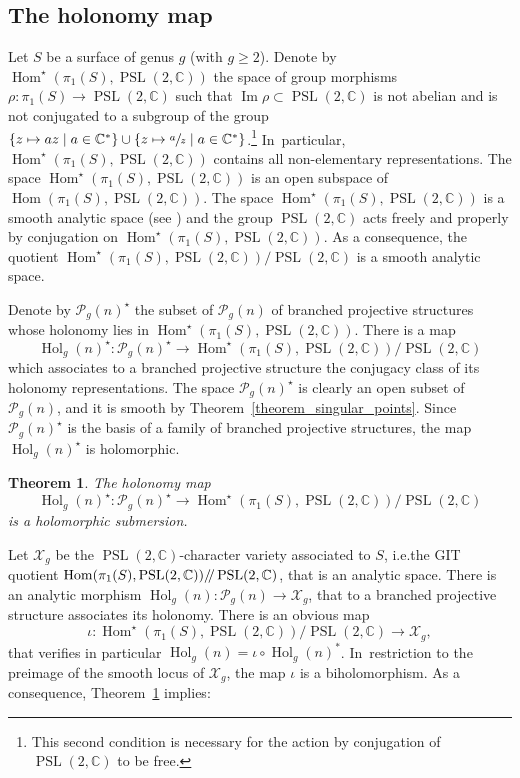\documentclass[10pt]{amsart}
\newcommand{\ie}{i.e.}
\newcommand\mto{\mathchoice{\longmapsto}{\mapsto}{\mapsto}{\mapsto}}
\newcommand{\C}{\mathbb C}
\DeclareMathOperator{\Hol}{Hol}
\DeclareMathOperator{\Hom}{Hom}
\DeclareMathOperator{\Image}{Im}
\DeclareMathOperator{\PSL}{PSL}
\theoremstyle{definition}
\theoremstyle{plain}
\newtheorem{theorem}[definition]{Theorem}
\begin{document}
\subsection{The holonomy map}

Let $S$ be a surface of genus $g$ (with $g \ge 2$).
Denote by $\Hom^{\star}(\pi_1(S), \PSL(2, \C))$ the space of group morphisms $\rho: \pi_1(S) \to \PSL(2, \C)$ such that $\Image \rho \subset \PSL(2, \C)$ is not abelian and is not conjugated to a subgroup of the group $\{z \mto az\mid a \in \C^*\} \cup\{z \mto \sfrac az \mid a \in \C^*\}$.\footnote{This second condition is necessary for the action by conjugation of $\PSL(2, \C)$ to be free.} In~particular, $\Hom^{\star}(\pi_1(S), \PSL(2, \C))$ contains all non-elementary representations.
The space $\Hom^{\star}(\pi_1(S), \PSL(2, \C))$ is an open subspace of $\Hom(\pi_1(S), \PSL(2, \C))$.
The space $\Hom^{\star}(\pi_1(S), \PSL(2, \C))$ is a smooth analytic space (see \cite{hubbard}) and the group $\PSL(2, \C)$ acts freely and properly by conjugation on $\Hom^{\star}(\pi_1(S), \PSL(2, \C))$.
As a consequence, the quotient $\Hom^{\star}(\pi_1(S), \PSL(2, \C)) / \PSL(2, \C)$ is a smooth analytic space.

Denote by $\mathcal P_g(n)^{\star}$ the subset of $\mathcal P_g(n)$ of branched projective structures whose holonomy lies in $\Hom^{\star}(\pi_1(S), \PSL(2, \C))$.
There is a map
\[
\Hol_g(n)^{\star}: \mathcal P_g(n)^{\star} \to \Hom^{\star}(\pi_1(S), \PSL(2, \C))/\PSL(2, \C)
\]
which associates to a branched projective structure the conjugacy class of its holonomy representations.
The space $\mathcal P_g(n)^{\star}$ is clearly an open subset of $\mathcal P_g(n)$, and it is smooth by Theorem~\ref{theorem_singular_points}.
Since $\mathcal P_g(n)^{\star}$ is the basis of a family of branched projective structures, the map $\Hol_g(n)^{\star}$ is holomorphic.

\begin{theorem}\label{theorem_holonomy}
The holonomy map
\[
\Hol_g(n)^{\star}: \mathcal P_g(n)^{\star} \to \Hom^{\star}(\pi_1(S), \PSL(2, \C))/\PSL(2, \C)
\]
is a holomorphic submersion.
\end{theorem}

Let $\mathcal X_g$ be the $\PSL(2, \C)$-character variety associated to $S$, \ie the GIT quotient $\Hom(\pi_1(S), \PSL(2, \C)) /\mkern-4mu/ \PSL(2, \C)$, that is an analytic space.
There is an analytic morphism $\Hol_g(n): \mathcal P_g(n) \to \mathcal X_g$, that to a branched projective structure associates its holonomy.
There is an obvious map
\[
\iota: \Hom^{\star}(\pi_1(S), \PSL(2, \C))/\PSL(2, \C) \to \mathcal X_g,
\]
that verifies in particular $\Hol_g(n) = \iota \circ \Hol_g(n)^*$. In~restriction to the preimage of the smooth locus of $\mathcal X_g$, the map $\iota$ is a biholomorphism.
As a consequence, Theorem~\ref{theorem_holonomy} implies:
\end{document}
